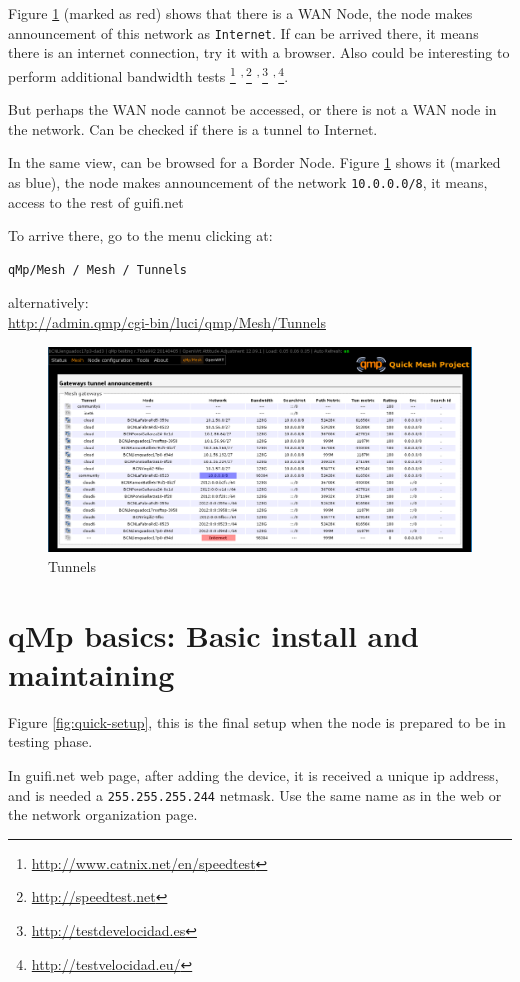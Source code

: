 \documentclass[11pt]{article}
\begin{document}
Figure \ref{fig:tunnels} (marked as red) shows that there is a WAN Node, the
node makes announcement of this network as \texttt{Internet}. If can be
arrived there, it means there is an internet connection, try it with a
browser. Also could be interesting to perform additional bandwidth
tests \footnote{\url{http://www.catnix.net/en/speedtest}} \textsuperscript{,}\,\footnote{\url{http://speedtest.net}} \textsuperscript{,}\,\footnote{\url{http://testdevelocidad.es}} \textsuperscript{,}\,\footnote{\url{http://testvelocidad.eu/}}.

But perhaps the WAN node cannot be accessed, or there is not a WAN
node in the network. Can be checked if there is a tunnel to Internet.

In the same view, can be browsed for a Border Node. Figure
\ref{fig:tunnels} shows it (marked as blue), the node makes announcement of
the network \texttt{10.0.0.0/8}, it means, access to the rest of guifi.net

\noindent
To arrive there, go to the menu clicking at:
\begin{verbatim}
qMp/Mesh / Mesh / Tunnels
\end{verbatim}
alternatively:\\
\url{http://admin.qmp/cgi-bin/luci/qmp/Mesh/Tunnels}

\begin{figure}[htb]
\centering
\includegraphics[width=.9\linewidth]{./img/qMp-basics-scrot/tunnels.png}
\caption{\label{fig:tunnels}Tunnels}
\end{figure}

\section{qMp basics: Basic install and maintaining}
\label{sec-6}
Figure \ref{fig:quick-setup}, this is the final setup when the node is
prepared to be in testing phase.

In guifi.net web page, after adding the device, it is received a unique ip
address, and is needed a \texttt{255.255.255.244} netmask. Use the same name
as in the web or the network organization page.
\end{document}
